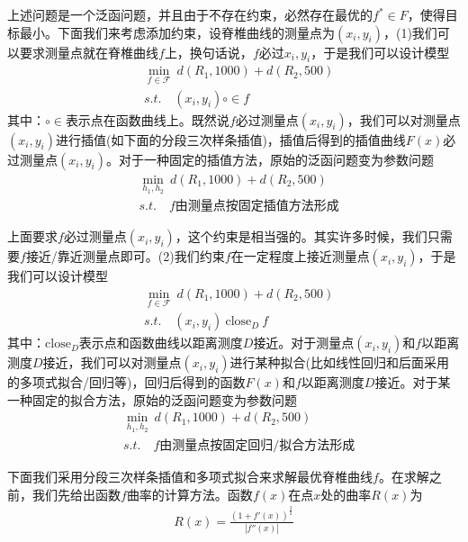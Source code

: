             上述问题是一个泛函问题，并且由于不存在约束，必然存在最优的$f^*\in F$，使得目标最小。下面我们来考虑添加约束，设脊椎曲线的测量点为$(x_i,y_i)$，(1)我们可以要求测量点就在脊椎曲线$f$上，换句话说，$f$必过$x_i,y_i$，于是我们可以设计模型
            \begin{align*}
            & \min_{f\in \mathcal{F}} \ d(R_1,1000)+d(R_2,500)\\
            & s.t.\quad (x_i,y_i)\circ\in f
            \end{align*}
            其中：$\circ\in$表示点在函数曲线上。既然说$f$必过测量点$(x_i,y_i)$，我们可以对测量点$(x_i,y_i)$进行插值(如下面的分段三次样条插值)，插值后得到的插值曲线$F(x)$必过测量点$(x_i,y_i)$。对于一种固定的插值方法，原始的泛函问题变为参数问题
            \begin{align*}
            & \min_{h_1,h_2} \ d(R_1,1000)+d(R_2,500)\\
            & s.t.\quad f\text{由测量点按固定插值方法形成}
            \end{align*}
            \par
            上面要求$f$必过测量点$(x_i,y_i)$，这个约束是相当强的。其实许多时候，我们只需要$f$接近/靠近测量点即可。(2)我们约束$f$在一定程度上接近测量点$(x_i,y_i)$，于是我们可以设计模型
            \begin{align*}
            & \min_{f\in \mathcal{F}} \ d(R_1,1000)+d(R_2,500)\\
            & s.t.\quad (x_i,y_i) \ \mathrm{close}_D\  f
            \end{align*}
            其中：$\mathrm{close}_D$表示点和函数曲线以距离测度$D$接近。对于测量点$(x_i,y_i)$和$f$以距离测度$D$接近，我们可以对测量点$(x_i,y_i)$进行某种拟合(比如线性回归和后面采用的多项式拟合/回归等)，回归后得到的函数$F(x)$和$f$以距离测度$D$接近。对于某一种固定的拟合方法，原始的泛函问题变为参数问题
            \begin{align*}
            & \min_{h_1,h_2} \ d(R_1,1000)+d(R_2,500)\\
            & s.t.\quad f\text{由测量点按固定回归/拟合方法形成}
            \end{align*}
            \par
            下面我们采用分段三次样条插值和多项式拟合来求解最优脊椎曲线$f$。在求解之前，我们先给出函数$f$曲率的计算方法。函数$f(x)$在点$x$处的曲率$R(x)$为
            \begin{align*}
            R(x)=\frac{(1+f'(x))^{\frac{3}{2}}}{|f''(x)|}
            \end{align*}
            \par
